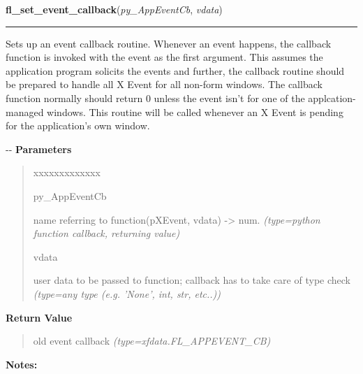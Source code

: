 \hspace{.8\funcindent}\begin{boxedminipage}{\funcwidth}

    \raggedright \textbf{fl\_set\_event\_callback}(\textit{py\_AppEventCb}, \textit{vdata})

    \vspace{-1.5ex}

    \rule{\textwidth}{0.5\fboxrule}
\setlength{\parskip}{2ex}

Sets up an event callback routine. Whenever an event happens, the
callback function is invoked with the event as the first argument.
This assumes the application program solicits the events and further,
the callback routine should be prepared to handle all X Event for all
non-form windows. The callback function normally should return 0
unless the event isn't for one of the applcation-managed windows.
This routine will be called whenever an X Event is pending for the
application's own window.

-{}-
\setlength{\parskip}{1ex}
      \textbf{Parameters}
      \vspace{-1ex}

      \begin{quote}
        \begin{Ventry}{xxxxxxxxxxxxx}

          \item[py\_AppEventCb]


name referring to function(pXEvent, vdata) -> num.
            {\it (type=python function callback, returning value)}

          \item[vdata]


user data to be passed to function; callback has to take care of
type check
            {\it (type=any type (e.g. 'None', int, str, etc..))}

        \end{Ventry}

      \end{quote}

      \textbf{Return Value}
    \vspace{-1ex}

      \begin{quote}

old event callback
      {\it (type=xfdata.FL\_APPEVENT\_CB)}

      \end{quote}

\textbf{Notes:}
\begin{quote}
  \begin{itemize}


\end{itemize}
\end{quote}
\end{boxedminipage}
